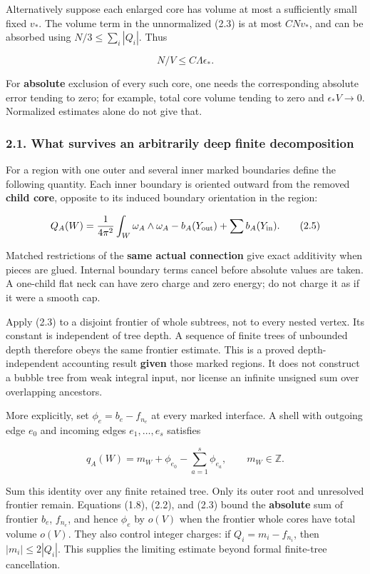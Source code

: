 \documentclass[
  11pt,
]{article}
\begin{document}
Alternatively suppose each enlarged core has volume at most a
sufficiently small fixed \(v_*\). The volume term in the unnormalized
(2.3) is at most \(CNv_*\), and can be absorbed using
\(N/3\le\sum_i|Q_i|\). Thus

\[
                        N/V\le C\Lambda\epsilon_*.
 \tag{2.4}
\]

For \textbf{absolute} exclusion of every such core, one needs the
corresponding absolute error tending to zero; for example, total core
volume tending to zero and \(\epsilon_*V\to0\). Normalized estimates
alone do not give that.

\hypertarget{what-survives-an-arbitrarily-deep-finite-decomposition}{%
\subsubsection{2.1. What survives an arbitrarily deep finite
decomposition}\label{what-survives-an-arbitrarily-deep-finite-decomposition}}

For a region with one outer and several inner marked boundaries define
the following quantity. Each inner boundary is oriented outward from the
removed \textbf{child core}, opposite to its induced boundary
orientation in the region:

\[
 Q_A(W)=\frac1{4\pi^2}\int_W\omega_A\wedge\omega_A
          -b_A(Y_{\rm out})+\sum b_A(Y_{\rm in}).
 \tag{2.5}
\]

Matched restrictions of the \textbf{same actual connection} give exact
additivity when pieces are glued. Internal boundary terms cancel before
absolute values are taken. A one-child flat neck can have zero charge
and zero energy; do not charge it as if it were a smooth cap.

Apply (2.3) to a disjoint frontier of whole subtrees, not to every
nested vertex. Its constant is independent of tree depth. A sequence of
finite trees of unbounded depth therefore obeys the same frontier
estimate. This is a proved depth-independent accounting result
\textbf{given} those marked regions. It does not construct a bubble tree
from weak integral input, nor license an infinite unsigned sum over
overlapping ancestors.

More explicitly, set \(\phi_e=b_e-f_{n_e}\) at every marked interface. A
shell with outgoing edge \(e_0\) and incoming edges \(e_1,\ldots,e_s\)
satisfies

\[
 q_A(W)=m_W+\phi_{e_0}-\sum_{a=1}^s\phi_{e_a},\qquad m_W\in\mathbb Z.
 \tag{2.6}
\]

Sum this identity over any finite retained tree. Only its outer root and
unresolved frontier remain. Equations (1.8), (2.2), and (2.3) bound the
\textbf{absolute} sum of frontier \(b_e\), \(f_{n_e}\), and hence
\(\phi_e\) by \(o(V)\) when the frontier whole cores have total volume
\(o(V)\). They also control integer charges: if \(Q_i=m_i-f_{n_i}\),
then \(|m_i|\le2|Q_i|\). This supplies the limiting estimate beyond
formal finite-tree cancellation.
\end{document}
